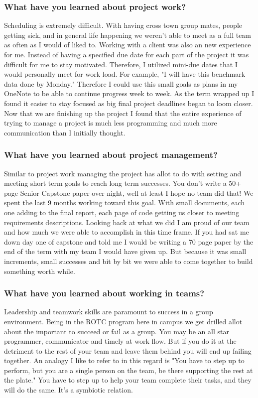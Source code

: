 \subsubsection{What have you learned about project work?}
Scheduling is extremely difficult. With having cross town group mates, people getting sick, and in general life happening we weren't able to meet as a full team as often as I would of liked to. Working with a client was also an new experience for me. Instead of having a specified due date for each part of the project it was difficult for me to stay motivated. Therefore, I utilized mini-due dates that I would personally meet for work load. For example, "I will have this benchmark data done by Monday." Therefore I could use this small goals as plans in my OneNote to be able to continue progress week to week. As the term wrapped up I found it easier to stay focused as big final project deadlines began to loom closer. Now that we are finishing up the project I found that the entire experience of trying to manage a project is much less programming and much more communication than I initially thought.
\subsubsection{What have you learned about project management?}
Similar to project work managing the project has allot to do with setting and meeting short term goals to reach long term successes. You don't write a 50+ page Senior Capstone paper over night, well at least I hope no team did that! We spent the last 9 months working toward this goal. With small documents, each one adding to the final report, each page of code getting us closer to meeting requirements descriptions. Looking back at what we did I am proud of our team and how much we were able to accomplish in this time frame. If you had sat me down day one of capstone and told me I would be writing a 70 page paper by the end of the term with my team I would have given up. But because it was small increments, small successes and bit by bit we were able to come together to build something worth while.
\subsubsection{What have you learned about working in teams?}
Leadership and teamwork skills are paramount to success in a group environment. Being in the ROTC program here in campus we get drilled allot about the important to succeed or fail as a group. You may be an all star programmer, communicator and timely at work flow. But if you do it at the detriment to the rest of your team and leave them behind you will end up failing together. An analogy I like to refer to in this regard is "You have to step up to perform, but you are a single person on the team, be there supporting the rest at the plate." You have to step up to help your team complete their tasks, and they will do the same. It's a symbiotic relation.
